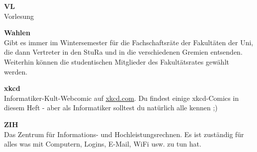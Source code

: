 \textbf{VL} \\
Vorlesung

\textbf{Wahlen} \\
Gibt es immer im Wintersemester für die Fachschaftsräte der Fakultäten der Uni, die dann Vertreter in den StuRa und in die verschiedenen Gremien entsenden.
Weiterhin können die studentischen Mitglieder des Fakultätsrates gewählt werden.

\textbf{xkcd} \\
Informatiker-Kult-Webcomic auf \url{xkcd.com}. Du findest einige xkcd-Comics in diesem Heft - aber als Informatiker solltest du natürlich alle kennen ;)

\textbf{ZIH} \\
Das Zentrum für Informations- und Hochleistungsrechnen.
Es ist zuständig für alles was mit Computern, Logins, E-Mail, WiFi usw. zu tun hat.

\onecolumn
